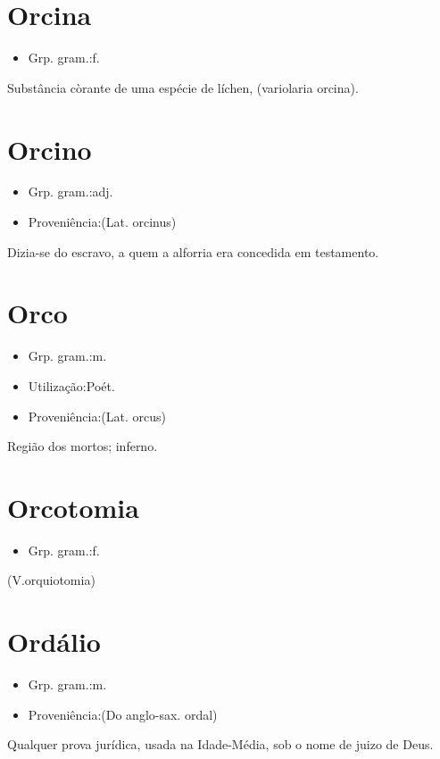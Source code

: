 \section{Orcina}
\begin{itemize}
\item {Grp. gram.:f.}
\end{itemize}
Substância còrante de uma espécie de líchen, (\textunderscore variolaria orcina\textunderscore ).
\section{Orcino}
\begin{itemize}
\item {Grp. gram.:adj.}
\end{itemize}
\begin{itemize}
\item {Proveniência:(Lat. \textunderscore orcinus\textunderscore )}
\end{itemize}
Dizia-se do escravo, a quem a alforria era concedida em testamento.
\section{Orco}
\begin{itemize}
\item {Grp. gram.:m.}
\end{itemize}
\begin{itemize}
\item {Utilização:Poét.}
\end{itemize}
\begin{itemize}
\item {Proveniência:(Lat. \textunderscore orcus\textunderscore )}
\end{itemize}
Região dos mortos; inferno.
\section{Orcotomia}
\begin{itemize}
\item {Grp. gram.:f.}
\end{itemize}
(V.orquiotomia)
\section{Ordálio}
\begin{itemize}
\item {Grp. gram.:m.}
\end{itemize}
\begin{itemize}
\item {Proveniência:(Do anglo-sax. \textunderscore ordal\textunderscore )}
\end{itemize}
Qualquer prova jurídica, usada na Idade-Média, sob o nome de \textunderscore juizo de Deus\textunderscore .
